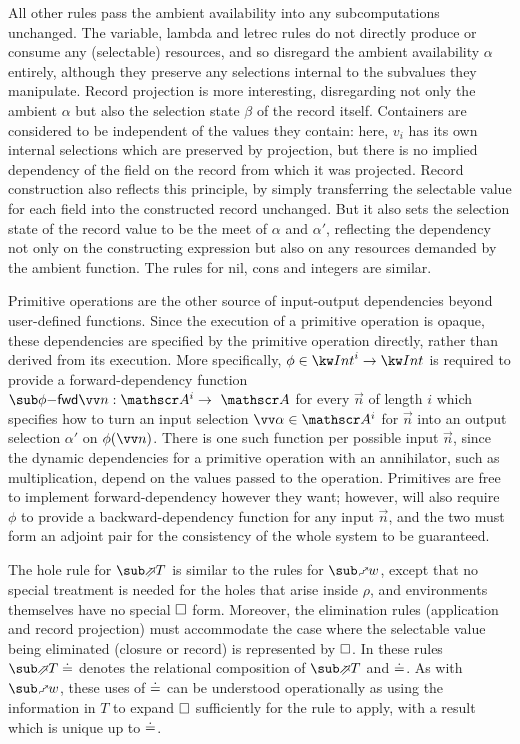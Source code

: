 All other rules pass the ambient availability into any subcomputations unchanged. The variable, lambda and letrec rules do not directly produce or consume any (selectable) resources, and so disregard the ambient availability $\alpha$ entirely, although they preserve any selections internal to the subvalues they manipulate. Record projection is more interesting, disregarding not only the ambient $\alpha$ but also the selection state $\beta$ of the record itself. Containers are considered to be independent of the values they contain: here, $v_i$ has its own internal selections which are preserved by projection, but there is no implied dependency of the field on the record from which it was projected. Record construction also reflects this principle, by simply transferring the selectable value for each field into the constructed record unchanged. But it also sets the selection state of the record value to be the meet of $\alpha$ and $\alpha'$, reflecting the dependency not only on the constructing expression but also on any resources demanded by the ambient function. The rules for nil, cons and integers are similar.

Primitive operations are the other source of input-output dependencies beyond user-defined functions. Since the execution of a primitive operation is opaque, these dependencies are specified by the primitive operation directly, rather than derived from its execution. More specifically, $\phi \in \tyInt^{i} \to \tyInt$ is required to provide a forward-dependency function $\primFwdBool{\phi}{\vec{n}}: \Ann{A}^i \to \Ann{A}$ for every $\vec{n}$ of length $i$ which specifies how to turn an input selection $\vec{\alpha} \in \Ann{A}^i$ for $\vec{n}$ into an output selection $\alpha'$ on $\exAppPrim{\phi}{\vec{n}}$. There is one such function per possible input $\vec{n}$, since the dynamic dependencies for a primitive operation with an annihilator, such as multiplication, depend on the values passed to the operation. Primitives are free to implement forward-dependency however they want; however,  will also require $\phi$ to provide a backward-dependency function for any input $\vec{n}$, and the two must form an adjoint pair for the consistency of the whole system to be guaranteed.

The hole rule for $\evalFwdF{T}$ is similar to the rules for $\matchFwdF{w}$, except that no special treatment is needed for the holes that arise inside $\rho$, and environments themselves have no special $\square$ form. Moreover, the elimination rules (application and record projection) must accommodate the case where the selectable value being eliminated (closure or record) is represented by $\square$. In these rules $\evalFwdR{T}\eq$ denotes the relational composition of $\evalFwdR{T}$ and $\doteq$. As with $\matchFwdF{w}$, these uses of $\doteq$ can be understood operationally as using the information in $T$ to expand $\square$ sufficiently for the rule to apply, with a result which is unique up to $\doteq$.

